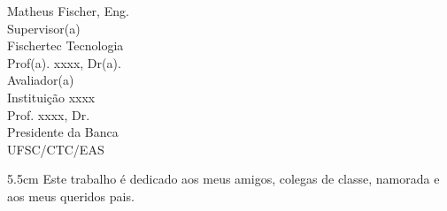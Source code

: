 \begin{folhadeaprovacao}
	\vspace*{2\baselineskip}
	Matheus Fischer, Eng.\\
	Supervisor(a) \\
	Fischertec Tecnologia\\
	
	\vspace*{2\baselineskip}
	Prof(a). xxxx, Dr(a).\\
	Avaliador(a) \\
	Instituição xxxx\\
	
	\vspace*{2\baselineskip}
	Prof. xxxx, Dr.\\
	Presidente da Banca \\
	UFSC/CTC/EAS
\end{folhadeaprovacao}

\begin{dedicatoria}
	\vspace*{\fill}
	\noindent
	\begin{adjustwidth*}{}{5.5cm} 
		\raggedleft
		Este trabalho é dedicado aos meus amigos, colegas de classe, namorada e aos meus queridos pais.
	\end{adjustwidth*}
\end{dedicatoria}

